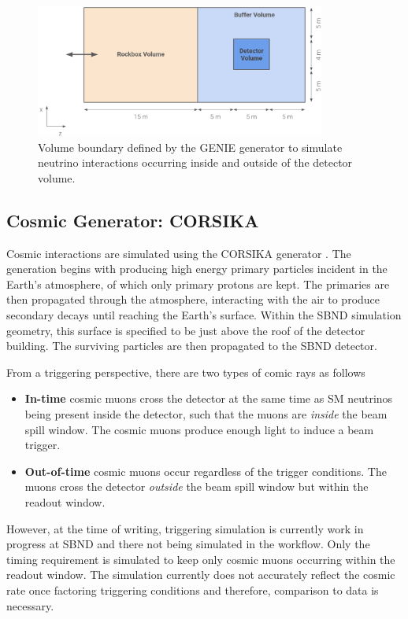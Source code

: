 \begin{figure}[htbp!] 
\centering    
\includegraphics[width=0.85\textwidth]{Rockbox_Volume}
\caption[Geometrical Boundary of The GENIE Generator]{
Volume boundary defined by the GENIE generator to simulate neutrino interactions occurring inside and outside of the detector volume. 
}
\label{fig:Rockbox_Volume}
\end{figure}

\subsection{Cosmic Generator: CORSIKA}
\label{sec:gen_corsika}

Cosmic interactions are simulated using the CORSIKA generator \cite{corsika}.
The generation begins with producing high energy primary particles incident in the Earth's atmosphere, of which only primary protons are kept. 
The primaries are then propagated through the atmosphere, interacting with the air to produce secondary decays until reaching the Earth's surface.
Within the SBND simulation geometry, this surface is specified to be just above the roof of the detector building.
The surviving particles are then propagated to the SBND detector.

From a triggering perspective, there are two types of comic rays as follows 
\begin{itemize}
        \item\textbf{In-time} cosmic muons cross the detector at the same time as SM neutrinos being present inside the detector, such that the muons are \textit{inside} the beam spill window. The cosmic muons produce enough light to
 induce a beam trigger.                            
        \item\textbf{Out-of-time} cosmic muons occur regardless of the trigger conditions. The muons cross the detector \textit{outside} the beam spill window but within the readout window.  
\end{itemize}
However, at the time of writing, triggering simulation is currently work in progress at SBND and there not being simulated in the workflow. 
Only the timing requirement is simulated to keep only cosmic muons occurring within the readout window.
The simulation currently does not accurately reflect the cosmic rate once factoring triggering conditions and therefore, comparison to data is necessary. 

